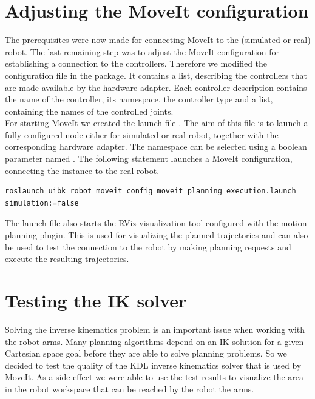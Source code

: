 \section{Adjusting the MoveIt configuration}

The prerequisites were now made for connecting MoveIt to the (simulated or real) robot. The last remaining step was to adjust the MoveIt configuration for establishing a connection to the  controllers. Therefore we modified the configuration file  in the  package. It contains a list, describing the controllers that are made available by the hardware adapter. Each controller description contains the name of the controller, its namespace, the controller type and a list, containing the names of the controlled joints.\\

For starting MoveIt we created the launch file . The aim of this file is to launch a fully configured  node either for simulated or real robot, together with the corresponding hardware adapter. The namespace can be selected using a boolean parameter named . The following statement launches a MoveIt configuration, connecting the  instance to the real robot.
{\small 
\begin{verbatim}
roslaunch uibk_robot_moveit_config moveit_planning_execution.launch simulation:=false
\end{verbatim}}
The launch file also starts the RViz visualization tool configured with the motion planning plugin. This is used for visualizing the planned trajectories and can also be used to test the connection to the robot by making planning requests and execute the resulting trajectories.

\section{Testing the IK solver}

Solving the inverse kinematics problem is an important issue when working with the robot arms. Many planning algorithms depend on an IK solution for a given Cartesian space goal before they are able to solve planning problems. So we decided to test the quality of the KDL inverse kinematics solver that is used by MoveIt. As a side effect we were able to use the test results to visualize the area in the robot workspace that can be reached by the robot the arms. \\

